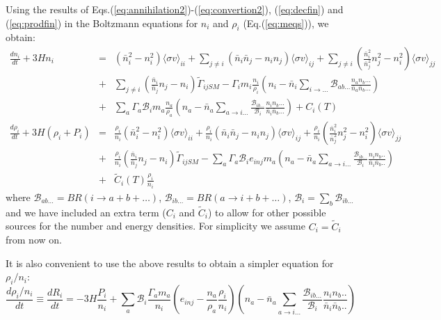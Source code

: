 \documentclass[preprint,notoc]{JHEP3}
\def\to{\rightarrow}
\def\to{\rightarrow}
\newcommand\Drv[2]{\frac{d #1}{d #2}}
\begin{document}
Using the results of Eqs.(\ref{eq:annihilation2})-(\ref{eq:convertion2}), (\ref{eq:decfin}) and
(\ref{eq:prodfin}) in the Boltzmann equations for $n_i$ and $\rho_i$
(Eq.(\ref{eq:meqs})), we obtain:
\begin{eqnarray}
\Drv{n_i}{t} + 3H n_i  & = &  \left( \bar{n}_i^2 - n_i^2 \right) \langle \sigma
v \rangle_{ii} + \sum_{j\neq i} \left( \bar{n}_i \bar{n}_j - n_i n_j \right) \langle \sigma
v \rangle_{ij} + \sum_{j\neq i} \left(\frac{\bar{n}_i^2}{\bar{n}_j^2} n_j^2  - n_i^2 \right) \langle \sigma v \rangle_{jj} \nonumber
\\
& + & \sum_{j\neq i} \left(\frac{\bar{n}_i}{\bar{n}_j} n_j  - n_i\right)  \tilde{\Gamma}_{ijSM} - \Gamma_i m_i \frac{n_i}{\rho_i}\left(n_i - \bar{n}_i \sum_{i\to\ldots}
\mathcal{B}_{ab\ldots} \frac{n_a n_b \ldots}{\bar{n}_a \bar{n}_b \ldots} \right)
\nonumber
\\
& + & \sum_a 
\Gamma_a \mathcal{B}_i m_a \frac{n_a}{\rho_a} \left(n_a - \bar{n}_a \sum_{a \to
i\ldots} \frac{\mathcal{B}_{ib\ldots}}{\mathcal{B}_{i}} \frac{n_i n_b \ldots}{\bar{n}_i \bar{n}_b \ldots} \right)  + C_{i}(T) \label{eq:nieq} \\
\Drv{\rho_i}{t} + 3H (\rho_i + P_i) & = & \frac{\rho_i}{n_i} \left( \bar{n}_i^2 - n_i^2 \right) \langle \sigma
v \rangle_{ii} + \frac{\rho_i}{n_i}  \left( \bar{n}_i \bar{n}_j - n_i n_j \right) \langle \sigma
v \rangle_{ij} + \frac{\rho_i}{n_i} \left(\frac{\bar{n}_i^2}{\bar{n}_j^2} n_j^2  - n_i^2 \right) \langle \sigma v \rangle_{jj} \nonumber
\\
& + &\frac{\rho_i}{n_i}  \left(\frac{\bar{n}_i}{\bar{n}_j} n_j  - n_i\right)  \tilde{\Gamma}_{ijSM} - \sum_a \Gamma_a  \mathcal{B}_i e_{inj} m_a \left( n_a -
 \bar{n}_a \sum_{a \to i\ldots}  \frac{\mathcal{B}_{ib\ldots}}{\mathcal{B}_{i}} \frac{n_i
 n_b..}{\bar{n}_i \bar{n}_b..} \right) \nonumber
\\
& + & \tilde{C}_{i}(T)
 \frac{\rho_i}{n_i}
\end{eqnarray}
where $\mathcal{B}_{ab\ldots} = BR(i \to a + b+ \ldots)$, $\mathcal{B}_{ib\ldots} =
BR(a \to i + b + \ldots)$, $\mathcal{B}_i = \sum_b \mathcal{B}_{ib\ldots}$ and
we have included an extra term ($C_i$ and $\tilde{C}_i$) to allow for other possible sources for the number and energy densities. 
For simplicity we assume $C_i = \tilde{C}_{i}$ from now on.


It is also convenient to use the above results to obtain a simpler equation for
$\rho_i/n_i$:
\begin{equation}
\Drv{\rho_i/n_i}{t} \equiv \Drv{R_i}{t} = -3 H \frac{P_i}{n_i} + \sum_{a}
\mathcal{B}_{i} \frac{\Gamma_a m_a}{n_i} \left( e_{inj} - \frac{n_a}{\rho_a} \frac{\rho_i}{n_i} \right) \left(n_a -
\bar{n}_a \sum_{a \to i\ldots} \frac{\mathcal{B}_{ib\ldots}}{\mathcal{B}_{i}} \frac{n_i
 n_b..}{\bar{n}_i \bar{n}_b..}\right) \label{eq:Rieq}
\end{equation}
\end{document}
